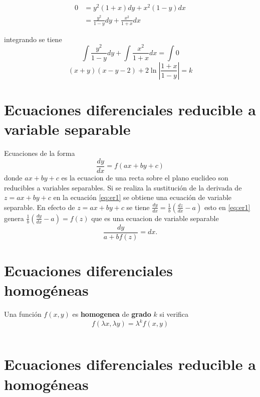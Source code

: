 \documentclass[10pt,]{krantz}
\theoremstyle{definition}
\theoremstyle{definition}
\theoremstyle{definition}
\theoremstyle{remark}
\let\BeginKnitrBlock\begin \let\EndKnitrBlock\end
\begin{document}
\BeginKnitrBlock{solution}
{}\begin{align*}
0&=y^2\left(1+x\right)dy+x^2\left(1-y\right)dx\\
&=\frac{y^2}{1-y}dy+\frac{x^2}{1+x}dx
\end{align*}

integrando se tiene \[\int\frac{y^2}{1-y}dy+\int\frac{x^2}{1+x}dx=\int 0\]
\[(x+y)(x-y-2)+2\ln\left\vert\frac{1+x}{1-y}\right\vert=k\]
\EndKnitrBlock{solution}

\hypertarget{ecuaciones-diferenciales-reducible-a-variable-separable}{%
\section{Ecuaciones diferenciales reducible a variable separable}\label{ecuaciones-diferenciales-reducible-a-variable-separable}}

Ecuaciones de la forma
\begin{equation}
\frac{dy}{dx}=f(ax+by+c)\label{eq:er1}
\end{equation}
donde \(ax+by+c\) es la ecuacion de una recta sobre el plano euclideo son reducibles a variables separables. Si se realiza la sustitución de la derivada de \(z=ax+by+c\) en la ecuación \eqref{eq:er1} se obtiene una ecuación de variable separable. En efecto de \(z=ax+by+c\) se tiene \(\frac{dy}{dx}=\frac{1}{b}\left(\frac{dz}{dx}-a\right)\) esto en \eqref{eq:er1} genera \(\frac{1}{b}\left(\frac{dy}{dx}-a\right)=f(z)\) que es una ecuacion de variable separable \[\frac{dy}{a+bf(z)}=dx.\]

\hypertarget{ecuaciones-diferenciales-homoguxe9neas}{%
\section{Ecuaciones diferenciales homogéneas}\label{ecuaciones-diferenciales-homoguxe9neas}}

\BeginKnitrBlock{definition}
\protect\hypertarget{def:unnamed-chunk-5}{}{\label{def:unnamed-chunk-5} }Una función \(f(x,y)\) es \textbf{homogenea} de \textbf{grado} \(k\) si verifica \[f\left(\lambda x, \lambda y\right)=\lambda^kf(x,y)\]
\EndKnitrBlock{definition}

\begin{verbatim}
\end{verbatim}

\hypertarget{ecuaciones-diferenciales-reducible-a-homoguxe9neas}{%
\section{Ecuaciones diferenciales reducible a homogéneas}\label{ecuaciones-diferenciales-reducible-a-homoguxe9neas}}
\end{document}
